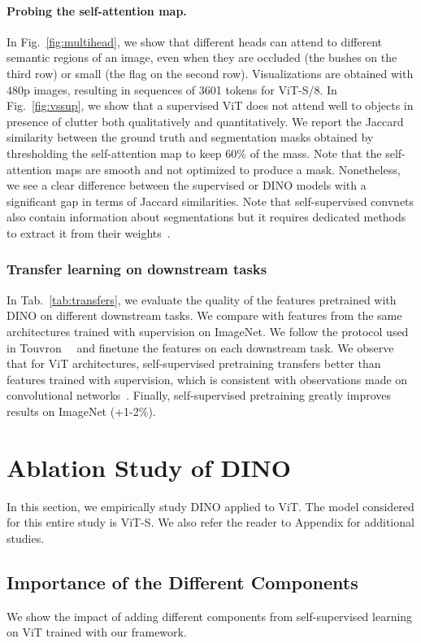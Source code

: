 \paragraph{Probing the self-attention map.} In Fig.~\ref{fig:multihead}, we show that different heads can attend to different semantic regions of an image,  even when they are occluded (the bushes on the third row) or small (the flag on the second row). Visualizations are obtained with $480$p images, resulting in sequences of 3601 tokens for ViT-S/8. In Fig.~\ref{fig:vssup}, we show that a supervised ViT does not attend well to objects in presence of clutter both qualitatively and quantitatively. We report the Jaccard similarity between the ground truth and segmentation masks obtained by thresholding the self-attention map to keep 60\% of the mass. Note that the self-attention maps are smooth and not optimized to produce a mask. Nonetheless, we see a clear difference between the supervised or DINO models with a significant gap in terms of Jaccard similarities. Note that self-supervised convnets also contain information about segmentations but it requires dedicated methods to extract it from their weights~\cite{gur2020visualization}.

\subsubsection{Transfer learning on downstream tasks} In Tab.~\ref{tab:transfers}, we evaluate the quality of the features pretrained with DINO on different downstream tasks. We compare with features from the same architectures trained with supervision on ImageNet. We follow the protocol used in Touvron~\etal~\cite{touvron2020training} and finetune the features on each downstream task. We observe that for ViT architectures, self-supervised pretraining transfers better than features trained with supervision, which is consistent with observations made on convolutional networks~\cite{caron2020unsupervised,he2020momentum,sariyildiz2020concept}. Finally, self-supervised pretraining greatly improves results on ImageNet (+1-2\%). 

\section{Ablation Study of DINO} In this section, we empirically study DINO applied to ViT. The model considered for this entire study is ViT-S. We also refer the reader to Appendix for additional studies.

\subsection{Importance of the Different Components}
\label{sec:comp}
We show the impact of adding different components from self-supervised learning on ViT trained with our framework. 


